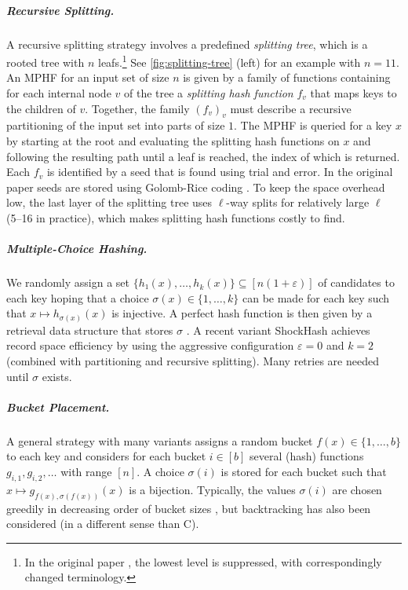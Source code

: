 \documentclass[cleveref,thm-restate]{lipics-v2021}
\def\consensus{\texorpdfstring{C\scalebox{0.8}{ONSENSUS}}{CONSENSUS}\xspace}
\begin{document}
\subparagraph{Recursive Splitting.}
A recursive splitting strategy \cite{esposito2020recsplit} involves a predefined \emph{splitting tree}, which is a rooted tree with $n$ leafs.\footnote{In the original paper \cite{esposito2020recsplit}, the lowest level is suppressed, with correspondingly changed terminology.}
See \cref{fig:splitting-tree} (left) for an example with $n = 11$.
An MPHF for an input set of size $n$ is given by a family of functions containing for each internal node $v$ of the tree a \emph{splitting hash function} $f_v$ that maps keys to the children of $v$.
Together, the family $(f_v)_v$ must describe a recursive partitioning of the input set into parts of size $1$.
The MPHF is queried for a key $x$ by starting at the root and evaluating the splitting hash functions on $x$ and following the resulting path until a leaf is reached, the index of which is returned.
Each $f_v$ is identified by a seed that is found using trial and error.
In the original paper \cite{esposito2020recsplit} seeds are stored using Golomb-Rice coding \cite{golomb1966run,rice1979some}.
To keep the space overhead low, the last layer of the splitting tree uses $\ell$-way splits for relatively large $\ell$ (5--16 in practice), which makes splitting hash functions costly to find.

\subparagraph{Multiple-Choice Hashing.}
We randomly assign a set $\{h₁(x),…,h_{k}(x)\} ⊆ [n(1+ε)]$ of candidates to each key hoping that a choice $σ(x) ∈ \{1,…,k\}$ can be made for each key such that $x ↦ h_{σ(x)}(x)$ is injective. A perfect hash function is then given by a retrieval data structure that stores $σ$ \cite{BPZ:Practical:2013,Vigna:Fast-Scalable-Construction-of-Functions:2016,LSW:SicHash:2023}.
A recent variant ShockHash \cite{lehmann2023shockhash,lehmann2024shockhash2} achieves record space efficiency by using the aggressive configuration $ε = 0$ and $k = 2$ (combined with partitioning and recursive splitting). Many retries are needed until $σ$ exists.

\subparagraph{Bucket Placement.}
A general strategy with many variants assigns a random bucket $f(x) ∈ \{1,…,b\}$ to each key and considers for each bucket $i ∈ [b]$ several (hash) functions $g_{i,1},g_{i,2},…$ with range $[n]$. A choice $σ(i)$ is stored for each bucket such that $x ↦ g_{f(x),σ(f(x))}(x)$ is a bijection. Typically, the values $σ(i)$ are chosen greedily in decreasing order of bucket sizes \cite{pibiri2021pthash,hermann2024phobic,belazzougui2009hash}, but backtracking has also been considered \cite{yang1985backtracking,fox1992practical} (in a different sense than \consensus).
\end{document}
